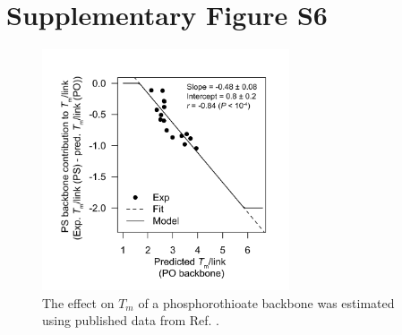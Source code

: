 \documentclass[a4paper,11pt]{article}
\newenvironment{Ncenter}{%
  \setlength\topsep{-10pt}
  \setlength\parskip{-10pt}
  \begin{center}
}{%
  \end{center}
}
\begin{document}
\section{Supplementary Figure S6}
\begin{figure}[!h]
\begin{Ncenter}
\includegraphics[width=0.65\textwidth]{SuppFig_PS.pdf}
\end{Ncenter}
\caption{The effect on $T_m$ of a phosphorothioate backbone was estimated using published data from Ref. \cite{Hashem:1998kf}.}\label{fig:figPS}
\end{figure}


\end{document}
